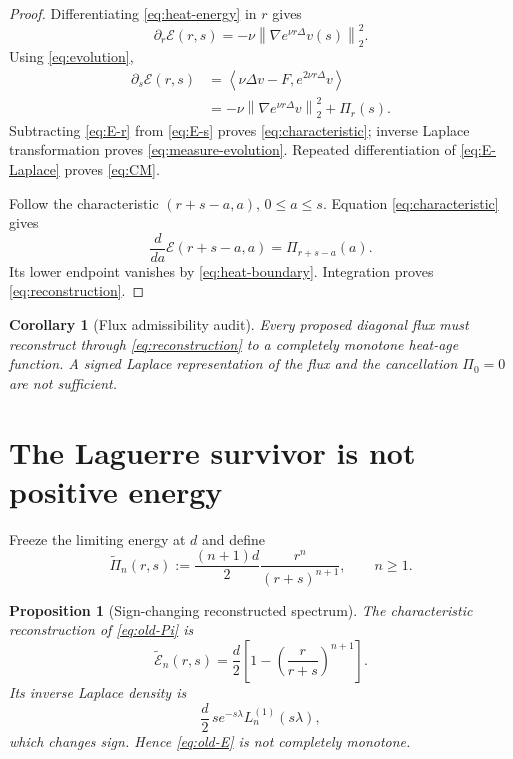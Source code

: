 \documentclass[11pt]{article}
\newtheorem{proposition}[theorem]{Proposition}
\newtheorem{corollary}[theorem]{Corollary}
\theoremstyle{remark}
\newcommand{\norm}[1]{\left\|#1\right\|}
\newcommand{\ip}[2]{\left\langle #1,#2\right\rangle}
\begin{document}
\begin{proof}
Differentiating \eqref{eq:heat-energy} in \(r\) gives
\begin{equation}
\label{eq:E-r}
 \partial_r\mathcal E(r,s)
 =-\nu\norm{\nabla e^{\nu r\Delta}v(s)}_2^2.
\end{equation}
Using \eqref{eq:evolution},
\begin{equation}
\label{eq:E-s}
\begin{aligned}
 \partial_s\mathcal E(r,s)
 &=
 \ip{\nu\Delta v-F}{e^{2\nu r\Delta}v}\\
 &=
 -\nu\norm{\nabla e^{\nu r\Delta}v}_2^2+\Pi_r(s).
\end{aligned}
\end{equation}
Subtracting \eqref{eq:E-r} from \eqref{eq:E-s} proves
\eqref{eq:characteristic}; inverse Laplace transformation proves
\eqref{eq:measure-evolution}.  Repeated differentiation of
\eqref{eq:E-Laplace} proves \eqref{eq:CM}.

Follow the characteristic \((r+s-a,a)\), \(0\le a\le s\).  Equation
\eqref{eq:characteristic} gives
\[
 \frac d{da}\mathcal E(r+s-a,a)=\Pi_{r+s-a}(a).
\]
Its lower endpoint vanishes by \eqref{eq:heat-boundary}.  Integration
proves \eqref{eq:reconstruction}.
\end{proof}

\begin{corollary}[Flux admissibility audit]
\label{cor:audit}
Every proposed diagonal flux must reconstruct through
\eqref{eq:reconstruction} to a completely monotone heat-age function.
A signed Laplace representation of the flux and the cancellation
\(\Pi_0=0\) are not sufficient.
\end{corollary}

\section{The Laguerre survivor is not positive energy}

Freeze the limiting energy at \(d\) and define
\begin{equation}
\label{eq:old-Pi}
 \widetilde\Pi_n(r,s)
 :=
 \frac{(n+1)d}{2}\frac{r^n}{(r+s)^{n+1}},
 \qquad n\ge1.
\end{equation}

\begin{proposition}[Sign-changing reconstructed spectrum]
\label{prop:laguerre-fails}
The characteristic reconstruction of \eqref{eq:old-Pi} is
\begin{equation}
\label{eq:old-E}
 \widetilde{\mathcal E}_n(r,s)
 =
 \frac d2
 \left[
 1-\left(\frac r{r+s}\right)^{n+1}
 \right].
\end{equation}
Its inverse Laplace density is
\begin{equation}
\label{eq:old-density}
 \frac d2\,s e^{-s\lambda}L_n^{(1)}(s\lambda),
\end{equation}
which changes sign.  Hence \eqref{eq:old-E} is not completely monotone.
\end{proposition}
\end{document}
